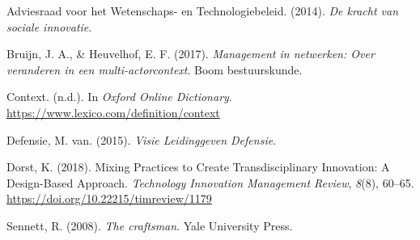 \documentclass[
]{book}
\newlength{\cslhangindent}
\newenvironment{CSLReferences}[2] %
 {%
  \setlength{\parindent}{0pt}
  \ifodd #1 \everypar{\setlength{\hangindent}{\cslhangindent}}\ignorespaces\fi
  \ifnum #2 > 0
  \setlength{\parskip}{#2\baselineskip}
  \fi
 }%
 {}
\begin{document}
\hypertarget{refs}{}
\begin{CSLReferences}{1}{0}
\leavevmode{}%
Adviesraad voor het Wetenschaps- en Technologiebeleid. (2014). \emph{De kracht van sociale innovatie}.

\leavevmode{}%
Bruijn, J. A., \& Heuvelhof, E. F. (2017). \emph{Management in netwerken: Over veranderen in een multi-actorcontext}. Boom bestuurskunde.

\leavevmode{}%
Context. (n.d.). In \emph{Oxford Online Dictionary}. \url{https://www.lexico.com/definition/context}

\leavevmode{}%
Defensie, M. van. (2015). \emph{Visie {Leidinggeven} {Defensie}}.

\leavevmode{}%
Dorst, K. (2018). Mixing {Practices} to {Create} {Transdisciplinary} {Innovation}: {A} {Design}-{Based} {Approach}. \emph{Technology Innovation Management Review}, \emph{8}(8), 60--65. \url{https://doi.org/10.22215/timreview/1179}

\leavevmode{}%
Sennett, R. (2008). \emph{The craftsman}. Yale University Press.

\end{CSLReferences}
\end{document}
